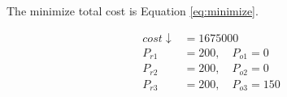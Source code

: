 \documentclass{article}
\begin{document}
  The minimize total cost is Equation \ref{eq:minimize}.

  \begin{equation}
    \begin{aligned}
      cost\downarrow &= 1675000 \\
      P_{r1} &= 200, \quad P_{o1} = 0 \\
      P_{r2} &= 200, \quad P_{o2} = 0 \\
      P_{r3} &= 200, \quad P_{o3} = 150
    \end{aligned}
    \label{eq:minimize}
  \end{equation}
\end{document}
